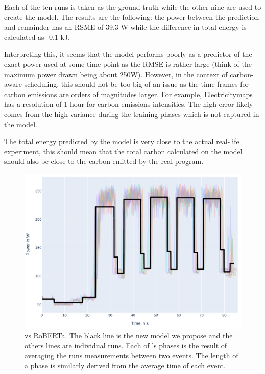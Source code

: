 Each of the ten runs is taken as the ground truth while the other nine are used to create the model. 
The results are the following: the power between the prediction and remainder has an RSME of 39.3 W while the difference in total energy is calculated as -0.1 kJ. 

Interpreting this, it seems that the model performs poorly as a predictor of the exact power used at some time point as the RMSE is rather large (think of the maximum power drawn being about 250W). 
However, in the context of carbon-aware scheduling, this should not be too big of an issue as the time frames for carbon emissions are orders of magnitudes larger. 
For example, Electricitymaps has a resolution of 1 hour for carbon emissions intensities. 
The high error likely comes from the high variance during the training phases which is not captured in the model.

The total energy predicted by the model is very close to the actual real-life experiment, this should mean that the total carbon calculated on the model should also be close to the carbon emitted by the real program.

\begin{figure}
    \includegraphics[width=\linewidth]{power-measurements/model_overlaid.pdf}
    \caption{\modelname{} vs RoBERTa. The black line is the new model we propose and the others lines are individual runs. Each of \modelname{}'s phases is the result of averaging the runs measurements between two events. The length of a phase is similarly derived from the average time of each event.}
    \label{fig:model_overlaid}
\end{figure}
